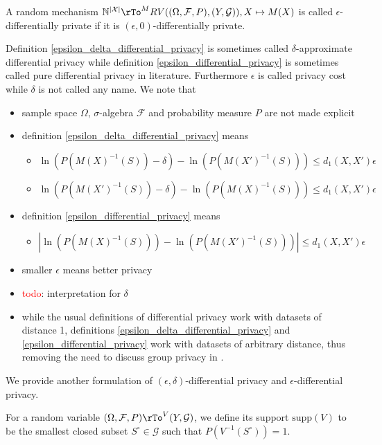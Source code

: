 \documentclass[12pt]{amsart}
\theoremstyle{definition}
\begin{document}
\dfn \label{epsilon_differential_privacy} A random mechanism $\mathbb{N}^{|\mathcal{X}|} \rTo^M RV((\Omega, \mathcal{F}, P), (Y, \mathcal{G})), X \mapsto M(X)$ is called $\epsilon$-differentially private if it is $(\epsilon, 0)$-differentially private.

Definition \ref{epsilon_delta_differential_privacy} is sometimes called $\delta$-approximate differential privacy while definition \ref{epsilon_differential_privacy} is sometimes called pure differential privacy in literature. Furthermore $\epsilon$ is called privacy cost while $\delta$ is not called any name. We note that
\begin{itemize}
\item sample space $\Omega$, $\sigma$-algebra $\mathcal{F}$ and probability measure $P$ are not made explicit
\item definition \ref{epsilon_delta_differential_privacy} means
\begin{itemize}
\item $\ln(P(M(X)^{-1}(S)) - \delta) - \ln(P(M(X')^{-1}(S))) \leq d_1(X, X') \epsilon$
\item $\ln(P(M(X')^{-1}(S)) - \delta) - \ln(P(M(X)^{-1}(S))) \leq d_1(X, X') \epsilon$
\end{itemize}
\item definition \ref{epsilon_differential_privacy} means 
\begin{itemize}
\item $|\ln(P(M(X)^{-1}(S))) - \ln(P(M(X')^{-1}(S)))| \leq d_1(X, X') \epsilon$
\end{itemize}
\item smaller $\epsilon$ means better privacy
\item \textcolor{red}{todo}: interpretation for $\delta$
\item while the usual definitions of differential privacy work with datasets of distance 1, definitions \ref{epsilon_delta_differential_privacy} and \ref{epsilon_differential_privacy} work with datasets of arbitrary distance, thus removing the need to discuss group privacy in \cite[2.3.2]{algorithmic_foundations}. 
\end{itemize}

We provide another formulation of $(\epsilon, \delta)$-differential privacy and $\epsilon$-differential privacy.

\dfn For a random variable $(\Omega, \mathcal{F}, P) \rTo^V (Y, \mathcal{G})$, we define its support $\text{supp}(V)$ to be the smallest closed subset $S^{\circ} \in \mathcal{G}$ such that $P(V^{-1}(S^{\circ})) = 1$.
\end{document}

